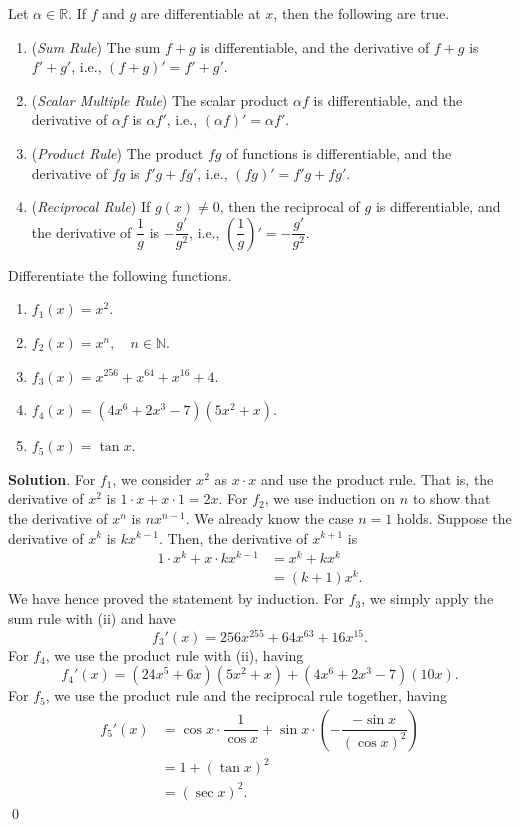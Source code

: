 \documentclass[11pt]{book}
\theoremstyle{break}
\theoremstyle{no_label}
\newcommand{\bbR}{\mathbb{R}}
\newcommand{\bbN}{\mathbb{N}}
\numberwithin{equation}{section}
\begin{document}
\setlength{\delimitershortfall}{0pt}
\begin{theorem}\label{diff_op}
    Let $\alpha\in\bbR$. If $f$ and $g$ are differentiable at $x$, then the following are true.
    \begin{enumerate}
        \item (\textit{Sum Rule}) The sum $f+g$ is differentiable, and the derivative of $f+g$ is $f'+g'$, i.e., $(f+g)'=f'+g'$.
        \item (\textit{Scalar Multiple Rule}) The scalar product $\alpha f$ is differentiable, and the derivative of $\alpha f$ is $\alpha f'$, i.e., $(\alpha f)'=\alpha f'$.
        \item (\textit{Product Rule}) The product $fg$ of functions is differentiable, and the derivative of $fg$ is $f'g+fg'$, i.e., $(fg)'=f'g+fg'$.
        \item (\textit{Reciprocal Rule}) If $g(x)\ne 0$, then the reciprocal of $g$ is differentiable, and the derivative of $\dfrac{1}{g}$ is $-\dfrac{g'}{g^2}$, i.e., $\left(\dfrac{1}{g}\right)'=-\dfrac{g'}{g^2}$.
    \end{enumerate}
\end{theorem}

\begin{example}
    Differentiate the following functions.
    \begin{enumerate}
        \item $f_1(x)=x^2$.
        \item $f_2(x)=x^n, \quad n\in\bbN$.
        \item $f_3(x)=x^{256}+x^{64}+x^{16}+4$.
        \item $f_4(x)=(4x^6+2x^3-7)(5x^2+x)$.
        \item $f_5(x)=\tan x$.
    \end{enumerate}
\end{example}
\textbf{Solution}. For $f_1$, we consider $x^2$ as $x\cdot x$ and use the product rule. That is, the derivative of $x^2$ is $1\cdot x+x\cdot 1=2x$. For $f_2$, we use induction on $n$ to show that the derivative of $x^n$ is $nx^{n-1}$. We already know the case $n=1$ holds. Suppose the derivative of $x^k$ is $kx^{k-1}$. Then, the derivative of $x^{k+1}$ is \begin{align*}
    1\cdot x^k+x\cdot kx^{k-1}&=x^k+kx^k\\
    &=(k+1)x^k.
\end{align*} We have hence proved the statement by induction. For $f_3$, we simply apply the sum rule with (ii) and have $${f_3}'(x)=256x^{255}+64x^{63}+16x^{15}.$$ For $f_4$, we use the product rule with (ii), having $${f_4}'(x)=(24x^5+6x)(5x^2+x)+(4x^6+2x^3-7)(10x).$$ For $f_5$, we use the product rule and the reciprocal rule together, having \begin{align*}
    {f_5}'(x)&=\cos x\cdot\dfrac{1}{\cos x}+\sin x\cdot\left(-\dfrac{-\sin x}{(\cos x)^2}\right)\\
    &=1+(\tan x)^2\\
    &=(\sec x)^2.
\end{align*} \qed
\setlength{\delimitershortfall}{13.5pt}
\end{document}
